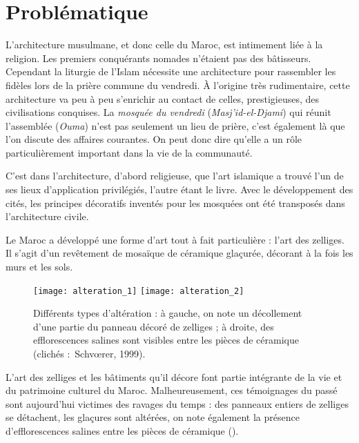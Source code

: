 
\chapter{Problématique}

L'architecture musulmane, et donc celle du Maroc, est intimement 
liée à la religion. Les premiers conquérants nomades n'étaient pas 
des bâtisseurs. Cependant la liturgie de l'Islam nécessite une 
architecture pour rassembler les fidèles lors de la prière commune du 
vendredi. À l'origine très rudimentaire, cette architecture va peu à 
peu s'enrichir au contact de celles, prestigieuses, des civilisations 
conquises. La \emph{mosquée du vendredi} (\emph{Masj'id-el-Djami}) 
qui réunit l'assemblée (\emph{Ouma}) n'est pas seulement un lieu de 
prière, c'est également là que l'on discute des affaires courantes. 
On peut donc dire qu'elle a un rôle particulièrement important dans 
la vie de la communauté.

C'est dans l'architecture, d'abord religieuse, que l'art islamique a 
trouvé l'un de ses lieux d'application privilégiés, l'autre étant le 
livre. Avec le développement des cités, les principes décoratifs 
inventés pour les mosquées ont été transposés dans l'architecture 
civile.

Le Maroc a développé une forme d'art tout à fait particulière : 
l'art des zelliges. Il s'agit d'un revêtement de mosaïque de 
céramique glaçurée, décorant à la fois les murs et les sols.

\begin{figure}[htb]
  \texttt{[image: alteration\_1]}%
  \quad%
  \texttt{[image: alteration\_2]}
  \caption{Différents types d'altération : à gauche, on note un 
           décollement d'une partie du panneau décoré de zelliges ; 
           à droite, des efflorescences salines sont visibles entre 
           les pièces de céramique (clichés :~Schv{\oe}rer, 1999).}
  \label{fig:alteration}
\end{figure}

L'art des zelliges et les bâtiments qu'il décore font partie 
intégrante de la vie et du patrimoine culturel du Maroc. 
Malheureusement, ces témoignages du passé sont aujourd'hui 
victimes des ravages du temps : des panneaux entiers de zelliges 
se détachent, les glaçures sont altérées, on note également la 
présence d'efflorescences salines entre les pièces de céramique
().

